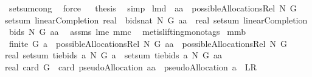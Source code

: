 \begin{isabellebody}
\ setsum{\isachardot}cong\ \isamarkupfalse%
\ force\isanewline
{}\isamarkupfalse%
\ \isamarkupfalse%
\ {\isacharquery}thesis\ \isamarkupfalse%
\ simp\isanewline
{}\isamarkupfalse%
%
\endisatagproof
{\isafoldproof}%
%
\isadelimproof
\isanewline
%
\endisadelimproof
\isanewline
{}\isamarkupfalse%
\ lm{}{}{}d{\isacharcolon}\ \ {\isachardoublequoteopen}aa\ {\isasymin}\ possibleAllocationsRel\ N\ G{\isachardoublequoteclose}\ \isanewline
{\isachardoublequoteopen}setsum\ {\isacharparenleft}{\isacharparenleft}linearCompletion{\isacharprime}\ {\isacharparenleft}real\ {\isasymcirc}\ {\isacharparenleft}bids{\isacharcolon}{\isacharcolon}{\isacharunderscore}{\isacharequal}{\isachargreater}nat{\isacharparenright}{\isacharparenright}\ N\ G{\isacharparenright}{\isacharparenright}\ aa\ {\isacharequal}\ real\ {\isacharparenleft}setsum\ {\isacharparenleft}{\isacharparenleft}linearCompletion{\isacharprime}\ bids\ N\ G{\isacharparenright}{\isacharparenright}\ aa{\isacharparenright}{\isachardoublequoteclose}\ \isanewline
%
\isadelimproof
%
\endisadelimproof
%
\isatagproof
{}\isamarkupfalse%
\ assms\ lm{}{}{}e\ mm{}{}c\ \isamarkupfalse%
\ {\isacharparenleft}metis{\isacharparenleft}lifting{\isacharcomma}mono{\isacharunderscore}tags{\isacharparenright}{\isacharparenright}%
\endisatagproof
{\isafoldproof}%
%
\isadelimproof
\isanewline
%
\endisadelimproof
\isanewline
{}\isamarkupfalse%
\ mm{}{}b{\isacharcolon}\ \isanewline
{}\ {\isachardoublequoteopen}finite\ G{\isachardoublequoteclose}\ {\isachardoublequoteopen}a\ {\isasymin}\ possibleAllocationsRel\ N\ G{\isachardoublequoteclose}\ {\isachardoublequoteopen}aa\ {\isasymin}\ possibleAllocationsRel\ N\ G{\isachardoublequoteclose}\isanewline
{}\ \isanewline
{\isachardoublequoteopen}real\ {\isacharparenleft}setsum\ {\isacharparenleft}tiebids{\isacharprime}\ a\ N\ G{\isacharparenright}\ a{\isacharparenright}\ {\isacharminus}\ setsum\ {\isacharparenleft}tiebids{\isacharprime}\ a\ N\ G{\isacharparenright}\ aa\ {\isacharequal}\ \isanewline
real\ {\isacharparenleft}card\ G{\isacharparenright}\ {\isacharminus}\ card\ {\isacharparenleft}pseudoAllocation\ aa\ {\isasyminter}\ {\isacharparenleft}pseudoAllocation\ a{\isacharparenright}{\isacharparenright}{\isachardoublequoteclose}\ {\isacharparenleft}\ {\isachardoublequoteopen}{\isacharquery}L{\isacharequal}{\isacharquery}R{\isachardoublequoteclose}{\isacharparenright}\isanewline

\end{isabellebody}
